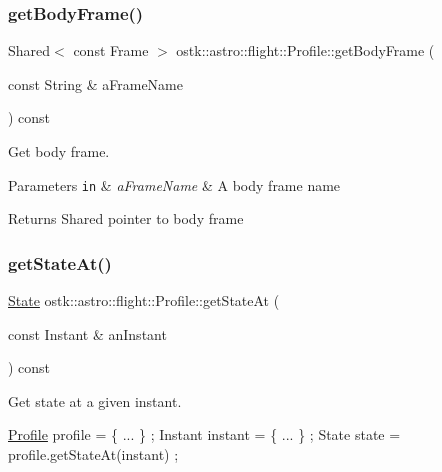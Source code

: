 \subsubsection{\texorpdfstring{get\+Body\+Frame()}{getBodyFrame()}}
{\footnotesize\ttfamily Shared$<$ const Frame $>$ ostk\+::astro\+::flight\+::\+Profile\+::get\+Body\+Frame (\begin{DoxyParamCaption}\item[{const String \&}]{a\+Frame\+Name }\end{DoxyParamCaption}) const}



Get body frame. 


\begin{DoxyParams}[1]{Parameters}
\mbox{\tt in}  & {\em a\+Frame\+Name} & A body frame name \\
\hline
\end{DoxyParams}
\begin{DoxyReturn}{Returns}
Shared pointer to body frame 
\end{DoxyReturn}
\mbox{\label{classostk_1_1astro_1_1flight_1_1_profile_a086758b767464ee2dc06cfda71fa3d48}} 
\subsubsection{\texorpdfstring{get\+State\+At()}{getStateAt()}}
{\footnotesize\ttfamily \hyperlink{classostk_1_1astro_1_1flight_1_1profile_1_1_state}{State} ostk\+::astro\+::flight\+::\+Profile\+::get\+State\+At (\begin{DoxyParamCaption}\item[{const Instant \&}]{an\+Instant }\end{DoxyParamCaption}) const}



Get state at a given instant. 


\begin{DoxyCode}
\hyperlink{classostk_1_1astro_1_1flight_1_1_profile_a09d523b4a58db0d8cc082b4a4d1418a7}{Profile} profile = \{ ... \} ;
Instant instant = \{ ... \} ;
State state = profile.getStateAt(instant) ;
\end{DoxyCode}



